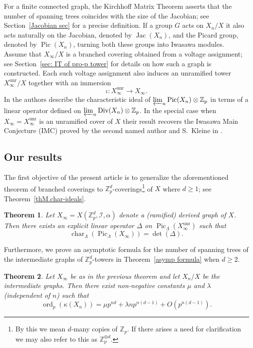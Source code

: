 \documentclass{amsart}
\newtheorem*{theorem*}{Theorem}
\numberwithin{equation}{section}
\theoremstyle{remark}
\newcommand{\Div}{\operatorname{Div}}
\newcommand{\Jac}{\operatorname{Jac}}
\newcommand{\Pic}{\operatorname{Pic}}
\newcommand{\ord}{\operatorname{ord}}
\newcommand{\Char}{\operatorname{char}}
\newcommand{\unr}{\operatorname{unr}}
\newcommand{\Z}{\mathbb{Z}}
\theoremstyle{plain} %
\begin{document}
For a finite connected graph, the Kirchhoff Matrix Theorem asserts that the number of spanning trees coincides with the size of the Jacobian; see Section~\ref{Jacobian sec} for a precise definition.
If a group $G$ acts on $X_n/X$ it also acts naturally on the Jacobian, denoted by $\Jac(X_n)$, and the Picard group, denoted by $\Pic(X_n)$, turning both these groups into Iwasawa modules.
Assume that $X_\infty/X$ is a branched covering obtained from a voltage assignment; see Section~\ref{sec: IT of pro-p tower} for details on how such a graph is constructed.
Each such voltage assignment also induces an unramified tower $X_\infty^{\unr}/X$ together with an immersion
\[
\iota \colon X_\infty^{\unr}\to X_\infty.
\]
In \cite{GV24} the authors describe the characteristic ideal of $\varprojlim_n \Pic(X_n)\otimes \Z_p$ in terms of a linear operator defined on $\varprojlim_n \Div(X_n)\otimes \Z_p$.
In the special case when $X_\infty = X_\infty^{\unr}$ is an unramified cover of $X$ their result recovers the Iwasawa Main Conjecture (IMC) proved by the second named author and S.~Kleine in  \cite{Kleine-Mueller4}.

\subsection*{Our results}
The first objective of the present article is to generalize the aforementioned theorem of branched coverings to $\Z_p^d$-coverings\footnote{{By this we mean $d$-many copies of $\Z_p$. If there arises a need for clarification we may also refer to this as $\Z_p^{\oplus d}$.}} of $X$ where $d\ge 1$; see Theorem~\ref{thM.char-ideals}.

\begin{theorem*}
Let $X_\infty=X(\Z_p^d,\mathcal{I},\alpha)$ denote a (ramified) derived graph of $X$.
Then there exists an explicit linear operator $\Delta$ on $\Pic_\Lambda(X_\infty^{\unr})$ such that 
\[
\Char_{\Lambda}(\Pic_\Lambda(X_\infty))=\det(\Delta).\]
\end{theorem*}

Furthermore, we prove an asymptotic formula for the number of spanning trees of the intermediate graphs of $\Z_p^d$-towers in Theorem~\ref{asymp formula} when $d\geq 2$.

\begin{theorem*}
Let $X_\infty$ be as in the previous theorem and let $X_n/X$ be the intermediate graphs.
Then there exist non-negative constants $\mu$ and $\lambda$ (independent of $n$) such that 
\[
\ord_p(\kappa(X_n) )=\mu p^{nd}+\lambda np^{n(d-1)}+O(p^{n(d-1)}).
\]
\end{theorem*}
\end{document}
